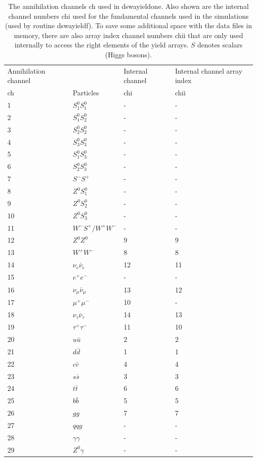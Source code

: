 \documentclass[a4paper,10pt,oneside]{book}
\newcommand{\code}[1]{\ft{#1}}
\newcommand{\ft}[1]{\textsf{#1}}
\begin{document}
\begin{table}
\begin{tabular}{llll}
Annihilation channel & & Internal channel & Internal channel array index  \\
\code{ch} & Particles & \code{chi} & \code{chii} \\ \hline
1 & $S_1^0 S_1^0$ & - & - \\
2 & $S_1^0 S_2^0$ & - & - \\
3 & $S_2^0 S_2^0$ & - & - \\
4 & $S_3^0 S_3^0$ & - & - \\
5 & $S_1^0 S_3^0$ & - & - \\
6 & $S_2^0 S_3^0$ & - & - \\
7 & $S^- S^+$ & - & - \\
8 & $Z^0 S_1^0$ & - & - \\
9 & $Z^0 S_2^0$ & - & - \\
10 & $Z^0 S_3^0$ & - & - \\
11 & $W^- S^+ / W^+ W^-$ & - & - \\
12 & $Z^0 Z^0$ & 9 & 9 \\
13 & $W^+ W^-$ & 8 & 8 \\
14 & $\nu_e \bar{\nu}_e$ & 12 & 11 \\
15 & $e^+ e^-$ & - & - \\
16 & $\nu_\mu \bar{\nu}_\mu$ & 13 & 12 \\
17 & $\mu^+ \mu^-$ & 10 & - \\
18 & $\nu_\tau \bar{\nu}_\tau$ & 14 & 13 \\
19 & $\tau^+ \tau^-$ & 11 & 10 \\
20 & $u \bar{u}$ & 2 & 2 \\
21 & $d \bar{d}$ & 1 & 1 \\
22 & $c \bar{c}$ & 4 & 4 \\
23 & $s \bar{s}$ & 3 & 3 \\
24 & $t \bar{t}$ & 6 & 6 \\
25 & $b \bar{b}$ & 5 & 5 \\
26 & $g g$ & 7 & 7 \\
27 & $q q g$ & - & - \\
28 & $\gamma \gamma$ & - & -\\
29 & $Z^0 \gamma$ & - & - \\ \hline
\end{tabular}
\caption{The annihilation channels \code{ch} used in \code{dswayieldone}. Also shown are the internal channel numbers \code{chi} used for the fundamental channels used in the simulations (used by routine \code{dswayieldf}). To save some additional space with the data files in memory, there are also array index channel numbers \code{chii} that are only used internally to access the right elements of the yield arrays. $S$ denotes scalars (Higgs bosons).
\label{tab:wa-channels}}
\end{table}
\end{document}
